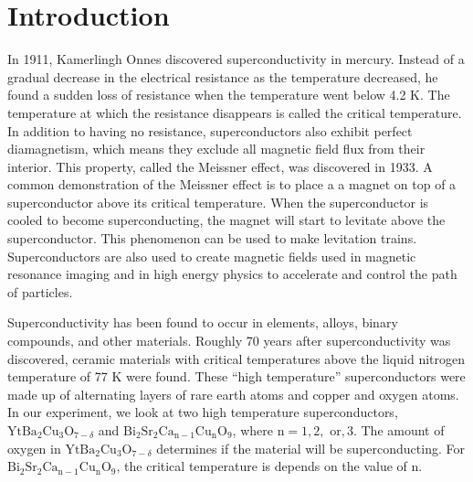 \documentclass[prb,preprint]{revtex4-1}
\begin{document}
\maketitle %


\section{Introduction} %
In 1911, Kamerlingh Onnes discovered superconductivity in mercury.  
Instead of a gradual decrease in the electrical resistance as the temperature decreased, he found a sudden loss of resistance when the temperature went below 4.2 K. 
The temperature at which the resistance disappears is called the critical temperature.
In addition to having no resistance, superconductors also exhibit perfect diamagnetism, which means they exclude all magnetic field flux from their interior. 
This property, called the Meissner effect, was discovered in 1933.\cite{intro}
A common demonstration of the Meissner effect is to place a a magnet on top of a superconductor above its critical temperature. When the superconductor is cooled to become superconducting, the magnet will start to levitate above the superconductor. 
This phenomenon can be used to make levitation trains.  Superconductors are also used to create magnetic fields used in magnetic resonance imaging and in high energy physics to accelerate and control the path of particles.\cite{kumar}

Superconductivity has been found to occur in elements, alloys, binary compounds, and other materials.  
Roughly 70 years after superconductivity was discovered, ceramic materials with critical temperatures above the liquid nitrogen temperature of 77 K were found.\cite{melissinos} 
These ``high temperature'' superconductors were made up of alternating layers of rare earth atoms and copper and oxygen atoms.\cite{kumar} 
In our experiment, we look at two high temperature superconductors, $\textrm{Yt}\textrm{Ba}_{2}\textrm{Cu}_{3}\textrm{O}_{7-\delta}$ and $\textrm{Bi}_{2}\textrm{Sr}_{2}\textrm{Ca}_{\textrm{n}-1}\textrm{Cu}_{\textrm{n}}\textrm{O}_{9}$, where $\textrm{n}=1,2,\textrm{ or},3$. %
The amount of oxygen in $\textrm{Yt}\textrm{Ba}_{2}\textrm{Cu}_{3}\textrm{O}_{7-\delta}$ determines if the material will be superconducting. For $\textrm{Bi}_{2}\textrm{Sr}_{2}\textrm{Ca}_{\textrm{n}-1}\textrm{Cu}_{\textrm{n}}\textrm{O}_{9}$, the critical temperature is depends on the value of n.
\end{document}
